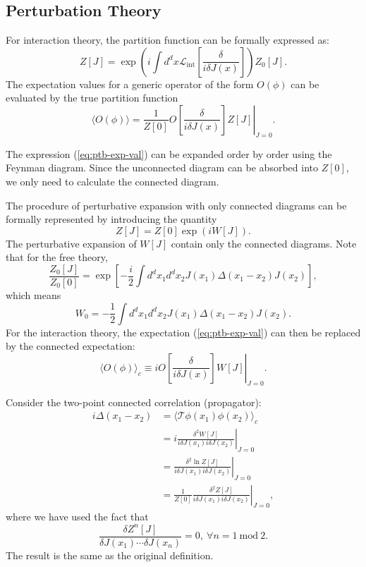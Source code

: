 \subsection{Perturbation Theory}
For interaction theory, the partition function can be formally expressed as:
\begin{equation}
	Z[J] = \exp\left(i\int d^dx \mathcal{L}_{\mathrm{int}}\left[\frac{\delta}{i\delta J(x)}\right]\right)Z_0[J].
\end{equation}
The expectation values for a generic operator of the form $O(\phi)$ can be evaluated by the true partition function
\begin{equation}\label{eq:ptb-exp-val}
	\langle O(\phi)\rangle
	= \frac{1}{Z[0]} \left. O\left[\frac{\delta}{i\delta J(x)}\right] Z[J] \right|_{J=0}.
\end{equation}

The expression (\ref{eq:ptb-exp-val}) can be expanded order by order using the Feynman diagram. 
Since the unconnected diagram can be absorbed into $Z[0]$, we only need to calculate the connected diagram.

The procedure of perturbative expansion with only connected diagrams can be formally represented by introducing the quantity
\begin{equation}
	Z[J] = Z[0]\exp\left(i W[J]\right).
\end{equation}
The perturbative expansion of $W[J]$ contain only the connected diagrams.
Note that for the free theory,
\begin{equation*}
	\frac{Z_0[J]}{Z_0[0]} = \exp\left[-\frac{i}{2}\int d^d x_1 d^d x_2 J(x_1) \Delta(x_1-x_2)J(x_2)\right],
\end{equation*}
which means
\begin{equation*}
	W_0 = -\frac{1}{2}\int d^d x_1 d^d x_2 J(x_1) \Delta(x_1-x_2)J(x_2).
\end{equation*}
For the interaction theory, the expectation (\ref{eq:ptb-exp-val}) can then be replaced by the connected expectation:
\begin{equation}
	\langle O(\phi)\rangle_c
	\equiv i\left. O\left[\frac{\delta}{i\delta J(x)}\right] W[J] \right|_{J=0}.
\end{equation}


Consider the two-point connected correlation (propagator):
\begin{equation}
\begin{aligned}
	i\Delta(x_1-x_2)
	&= \langle \mathcal{T}\phi(x_1) \phi(x_2)\rangle_c \\
	&= i\left.\frac{\delta^2 W[J]}{i\delta J(x_1) i\delta J(x_2)}\right|_{J=0} \\
	&= \left.\frac{\delta^2 \ln Z[J]}{i\delta J(x_1) i\delta J(x_2)}\right|_{J=0}\\
	&= \frac{1}{Z[0]}\left.\frac{\delta^2 Z[J]}{i\delta J(x_1)i\delta J(x_2)}\right|_{J=0},
\end{aligned}
\end{equation}
where we have used the fact that
\begin{equation}
	\frac{\delta Z^n[J]}{\delta J(x_1) \cdots \delta J(x_n)} = 0,\ \forall n = 1\ \mathrm{mod}\ 2.
\end{equation}
The result is the same as the original definition.

